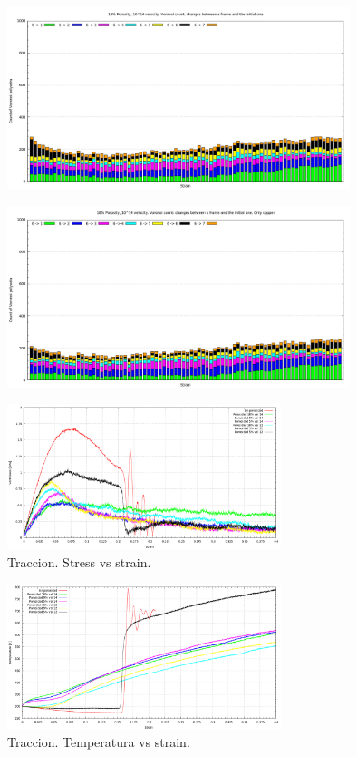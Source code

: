 \documentclass[10pt, oneside]{article} %
\begin{document}
\begin{figure}[H]
\centering
\includegraphics[width=10cm]{Figures/Porosidad_2vel_comp_voronoi_hist16.png}
\caption{}
\end{figure}

\begin{figure}[H]
\centering
\includegraphics[width=10cm]{Figures/Porosidad_2vel_comp_voronoi_hist17.png}
\caption{}
\label{fg:26comp}
\end{figure}

\begin{figure}[H]
\centering
\includegraphics[width=8cm]{Figures/Porosidad_VM_strain_2vel_trac.png}
\caption{Traccion. Stress vs strain.}
\label{fg:1trac}
\end{figure}

\begin{figure}[H]
\centering
\includegraphics[width=8cm]{Figures/Porosidad_temp_strain_2vel_trac.png}
\caption{Traccion. Temperatura vs strain.}
\label{fg:2trac}
\end{figure}
\end{document}
